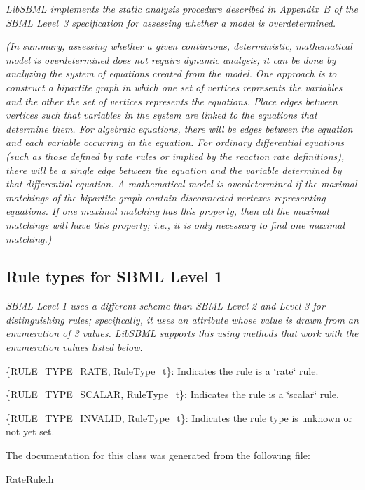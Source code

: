 {\itshape  Lib\+S\+B\+ML implements the static analysis procedure described in Appendix~B of the S\+B\+ML Level~3 specification for assessing whether a model is overdetermined.}

{\itshape  (In summary, assessing whether a given continuous, deterministic, mathematical model is overdetermined does not require dynamic analysis; it can be done by analyzing the system of equations created from the model. One approach is to construct a bipartite graph in which one set of vertices represents the variables and the other the set of vertices represents the equations. Place edges between vertices such that variables in the system are linked to the equations that determine them. For algebraic equations, there will be edges between the equation and each variable occurring in the equation. For ordinary differential equations (such as those defined by rate rules or implied by the reaction rate definitions), there will be a single edge between the equation and the variable determined by that differential equation. A mathematical model is overdetermined if the maximal matchings of the bipartite graph contain disconnected vertexes representing equations. If one maximal matching has this property, then all the maximal matchings will have this property; i.\+e., it is only necessary to find one maximal matching.)}

{\itshape }\hypertarget{classdoc__rules__general__summary_RuleType_t}{}\subsection{Rule types for S\+B\+M\+L Level 1}\label{classdoc__rules__general__summary_RuleType_t}
{\itshape  S\+B\+ML Level 1 uses a different scheme than S\+B\+ML Level 2 and Level 3 for distinguishing rules; specifically, it uses an attribute whose value is drawn from an enumeration of 3 values. Lib\+S\+B\+ML supports this using methods that work with the enumeration values listed below.}

{\itshape  \begin{DoxyItemize}
\item \{R\+U\+L\+E\+\_\+\+T\+Y\+P\+E\+\_\+\+R\+A\+TE, Rule\+Type\+\_\+t\}\+: Indicates the rule is a \char`\"{}rate\char`\"{} rule. \item \{R\+U\+L\+E\+\_\+\+T\+Y\+P\+E\+\_\+\+S\+C\+A\+L\+AR, Rule\+Type\+\_\+t\}\+: Indicates the rule is a \char`\"{}scalar\char`\"{} rule. \item \{R\+U\+L\+E\+\_\+\+T\+Y\+P\+E\+\_\+\+I\+N\+V\+A\+L\+ID, Rule\+Type\+\_\+t\}\+: Indicates the rule type is unknown or not yet set. \end{DoxyItemize}
}

The documentation for this class was generated from the following file\+:\begin{DoxyCompactItemize}
\item 
\hyperlink{_rate_rule_8h}{Rate\+Rule.\+h}\end{DoxyCompactItemize}
